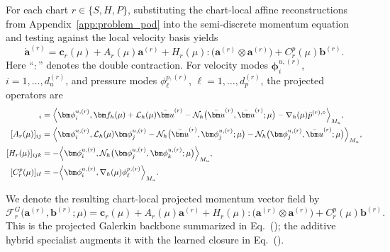 For each chart $r\in\{S,H,P\}$, substituting the chart-local affine reconstructions
from Appendix~\ref{app:problem_pod} into the semi-discrete
momentum equation and testing against the local velocity basis yields
\begin{equation}
    \dot{\bm a}^{(r)}
    =
    \bm c_r(\mu)
    +
    A_r(\mu)\bm a^{(r)}
    +
    H_r(\mu):
    \bigl(
        \bm a^{(r)}\otimes\bm a^{(r)}
    \bigr)
    +
    C_r^p(\mu)\bm b^{(r)}.
    \label{eq:app_projected_momentum}
\end{equation}
Here ``$:$'' denotes the double contraction.
For velocity modes
$\bm\phi_i^{u,(r)}$,
$i=1,\ldots,d_u^{(r)}$,
and pressure modes
$\phi_\ell^{p,(r)}$,
$\ell=1,\ldots,d_p^{(r)}$,
the projected operators are
\begin{align}
    [\bm c_r(\mu)]_i
    &=
    \Bigl\langle
        \bm\phi_i^{u,(r)},
        \bm f_h(\mu)
        +
        \mathcal L_h(\mu)\bar{\bm u}^{(r)}
        -
        \mathcal N_h
        \bigl(
            \bar{\bm u}^{(r)},
            \bar{\bm u}^{(r)};
            \mu
        \bigr)
        -
        \nabla_h(\mu)\bar p^{(r),\circ}
    \Bigr\rangle_{M_u},
    \\
    [A_r(\mu)]_{ij}
    &=
    \Bigl\langle
        \bm\phi_i^{u,(r)},
        \mathcal L_h(\mu)\bm\phi_j^{u,(r)}
        -
        \mathcal N_h
        \bigl(
            \bar{\bm u}^{(r)},
            \bm\phi_j^{u,(r)};
            \mu
        \bigr)
        -
        \mathcal N_h
        \bigl(
            \bm\phi_j^{u,(r)},
            \bar{\bm u}^{(r)};
            \mu
        \bigr)
    \Bigr\rangle_{M_u},
    \\
    [H_r(\mu)]_{ijk}
    &=
    -
    \Bigl\langle
        \bm\phi_i^{u,(r)},
        \mathcal N_h
        \bigl(
            \bm\phi_j^{u,(r)},
            \bm\phi_k^{u,(r)};
            \mu
        \bigr)
    \Bigr\rangle_{M_u},
    \\
    [C_r^p(\mu)]_{i\ell}
    &=
    -
    \Bigl\langle
        \bm\phi_i^{u,(r)},
        \nabla_h(\mu)\phi_\ell^{p,(r)}
    \Bigr\rangle_{M_u}.
    \label{eq:app_projected_operators}
\end{align}

We denote the resulting chart-local projected momentum vector field by
\begin{equation}
    \mathcal F_r^G
    \bigl(
        \bm a^{(r)},
        \bm b^{(r)};
        \mu
    \bigr)
    =
    \bm c_r(\mu)
    +
    A_r(\mu)\bm a^{(r)}
    +
    H_r(\mu):
    \bigl(
        \bm a^{(r)}\otimes\bm a^{(r)}
    \bigr)
    +
    C_r^p(\mu)\bm b^{(r)}.
    \label{eq:app_galerkin_backbone}
\end{equation}
This is the projected Galerkin backbone summarized in
Eq.~(); the additive hybrid specialist
augments it with the learned closure in Eq.~().


